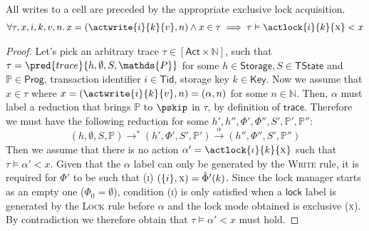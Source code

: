 \begin{lem}
	\label{lem:write}
	All writes to a cell are preceded by the appropriate exclusive lock acquisition.
	\begin{gather*}
	\forall \tau, x, i, k, v, n \ldotp
	x = (\actwrite{i}{k}{v}, n) \land x \in \tau \implies
	\tau \vDash \actlock{i}{k}{\textsc{x}} < x
	\end{gather*}
	
	\begin{proof}
	Let's pick an arbitrary trace $\tau \in [\mathsf{Act} \times \mathds{N}]$, such that $\tau = \pred{trace}{h, \emptyset, S, \mathds{P}}$ for some $h \in \mathsf{Storage}, S \in \mathsf{TState}$ and $\mathds{P} \in \mathsf{Prog}$, transaction identifier $i \in \mathsf{Tid}$, storage key $k \in \mathsf{Key}$. Now we assume that  $x \in \tau$ where $x = (\actwrite{i}{k}{v}, n) = (\alpha, n)$ for some $n \in \mathds{N}$. Then, $\alpha$ must label a reduction that brings $\mathds{P}$ to $\pskip$ in $\tau$, by definition of $\mathsf{trace}$. Therefore we must have the following reduction for some $h', h'', \Phi', \Phi'', S', \mathds{P}', \mathds{P}''$:
	\[
		(h, \emptyset, S, \mathds{P}) \rightarrow^* (h', \Phi', S', \mathds{P}') \xrightarrow{\alpha} (h'', \Phi'', S', \mathds{P}'')
	\]
	Then we assume that there is no action $\alpha' = \actlock{\iota}{k}{\textsc{x}}$ such that $\tau \vDash \alpha' < x$. Given that the $\alpha$ label can only be generated by the \textsc{Write} rule, it is required for $\Phi'$ to be such that (\textsc{i}) $(\{i\}, \textsc{x}) = \hat{\Phi}'(k)$. Since the lock manager starts as an empty one ($\Phi_0 = \emptyset$), condition (\textsc{i}) is only satisfied when a $\mathsf{lock}$ label is generated by the \textsc{Lock} rule before $\alpha$ and the lock mode obtained is exclusive (\textsc{x}). By contradiction we therefore obtain that $\tau \vDash \alpha' < x$ must hold.
	\end{proof}
\end{lem}

